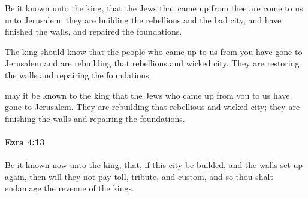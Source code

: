 			\begin{versebox}
					\item[BHS] 
					\item[LXX] 
					\item[ASV] Be it known unto the king, that the Jews that came up from thee are come to us unto Jerusalem; they are building the rebellious and the bad city, and have finished the walls, and repaired the foundations.
					\item[NIV] The king should know that the people who came up to us from you have gone to Jerusalem and are rebuilding that rebellious and wicked city. They are restoring the walls and repairing the foundations.
					\item[NRSV] may it be known to the king that the Jews who came up from you to us have gone to Jerusalem. They are rebuilding that rebellious and wicked city; they are finishing the walls and repairing the foundations.
			\end{versebox}

		\paragraph{Ezra 4:13} %
			\label{EZRA-4-13}

			Be it known now unto the king, that, if this city be builded, and the walls set up again, then will they not pay toll, tribute, and custom, and so thou shalt endamage the revenue of the kings.

